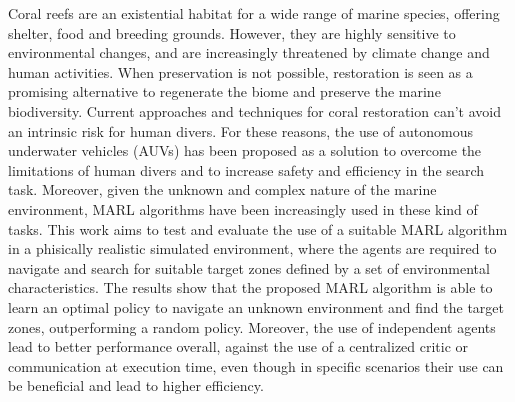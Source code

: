 Coral reefs are an existential habitat for a wide range of marine species, offering shelter, 
food and breeding grounds. However, they are highly sensitive to environmental changes, and 
are increasingly threatened by climate change and human activities. When preservation is not 
possible, restoration is seen as a promising alternative to regenerate the biome and preserve 
the marine biodiversity. Current approaches and techniques for coral restoration can't avoid
an intrinsic risk for human divers. For these reasons, the use of autonomous underwater vehicles
(AUVs) has been proposed as a solution to overcome the limitations of human divers and to increase
safety and efficiency in the search task. Moreover, given the unknown and complex nature of 
the marine environment, MARL algorithms have been increasingly used in these kind of tasks.
This work aims to test and evaluate the use of a suitable MARL algorithm in a phisically realistic 
simulated environment, where the agents are required to navigate and search for suitable target zones
defined by a set of environmental characteristics. 
The results show that the proposed MARL algorithm is able to learn an optimal policy to navigate
an unknown environment and find the target zones, outperforming a random policy. Moreover, 
the use of independent agents lead to better performance overall, against the use of a centralized 
critic or communication at execution time, even though in specific scenarios their use can be beneficial 
and lead to higher efficiency.